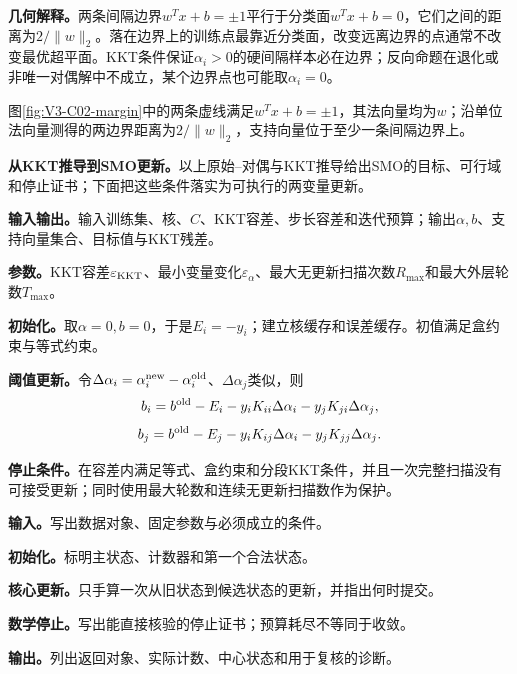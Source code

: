 \label{struct:V3-C02-CH10}
\begingroup
{}
\label{struct:V3-C02-CH14}
\begin{geometrybox}
\textbf{几何解释。}两条间隔边界$w^Tx+b=\pm1$平行于分类面$w^Tx+b=0$，它们之间的距离为$2/\lVert w\rVert_2$。落在边界上的训练点最靠近分类面，改变远离边界的点通常不改变最优超平面。KKT条件保证$\alpha_i>0$的硬间隔样本必在边界；反向命题在退化或非唯一对偶解中不成立，某个边界点也可能取$\alpha_i=0$。
\end{geometrybox}

\label{struct:V3-C02-CH17}

图\ref{fig:V3-C02-margin}中的两条虚线满足$w^Tx+b=\pm1$，其法向量均为$w$；沿单位法向量测得的两边界距离为$2/\lVert w\rVert_2$，支持向量位于至少一条间隔边界上。


\textbf{从KKT推导到SMO更新。}以上原始--对偶与KKT推导给出SMO的目标、可行域和停止证书；下面把这些条件落实为可执行的两变量更新。

\label{struct:V3-C02-CH19}
\label{struct:V3-C02-CH20}
\textbf{输入输出。}输入训练集、核、$C$、KKT容差、步长容差和迭代预算；输出$\alpha,b$、支持向量集合、目标值与KKT残差。

\label{struct:V3-C02-CH21}
\textbf{参数。}KKT容差$\varepsilon_{\rm KKT}$、最小变量变化$\varepsilon_\alpha$、最大无更新扫描次数$R_{\max}$和最大外层轮数$T_{\max}$。

\label{struct:V3-C02-CH22}
\textbf{初始化。}取$\alpha=0,b=0$，于是$E_i=-y_i$；建立核缓存和误差缓存。初值满足盒约束与等式约束。

\label{struct:V3-C02-CH23}
\textbf{阈值更新。}令$\Delta\alpha_i=\alpha_i^{\rm new}-\alpha_i^{\rm old}$、$\Delta\alpha_j$类似，则
\[
b_i=b^{\rm old}-E_i-y_iK_{ii}\Delta\alpha_i-y_jK_{ji}\Delta\alpha_j,
\]
\[
b_j=b^{\rm old}-E_j-y_iK_{ij}\Delta\alpha_i-y_jK_{jj}\Delta\alpha_j.
\]

\label{struct:V3-C02-CH24}
\textbf{停止条件。}在容差内满足等式、盒约束和分段KKT条件，并且一次完整扫描没有可接受更新；同时使用最大轮数和连续无更新扫描数作为保护。
\endgroup

\begin{keypointbox}[title={序列最小最优化（SMO）：五步阅读}]
\textbf{输入。}写出数据对象、固定参数与必须成立的条件。\par
\textbf{初始化。}标明主状态、计数器和第一个合法状态。\par
\textbf{核心更新。}只手算一次从旧状态到候选状态的更新，并指出何时提交。\par
\textbf{数学停止。}写出能直接核验的停止证书；预算耗尽不等同于收敛。\par
\textbf{输出。}列出返回对象、实际计数、中心状态和用于复核的诊断。
\end{keypointbox}

